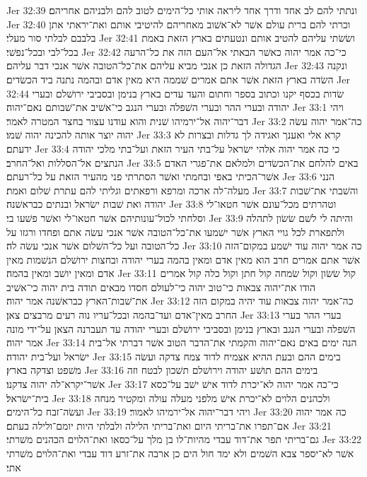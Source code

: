 Jer 32:39  ונתתי להם לב אחד ודרך אחד ליראה אותי כל־הימים לטוב להם ולבניהם אחריהם׃
Jer 32:40  וכרתי להם ברית עולם אשׁר לא־אשׁוב מאחריהם להיטיבי אותם ואת־יראתי אתן בלבבם לבלתי סור מעלי׃
Jer 32:41  ושׂשׂתי עליהם להטיב אותם ונטעתים בארץ הזאת באמת בכל־לבי ובכל־נפשׁי׃
Jer 32:42  כי־כה אמר יהוה כאשׁר הבאתי אל־העם הזה את כל־הרעה הגדולה הזאת כן אנכי מביא עליהם את־כל־הטובה אשׁר אנכי דבר עליהם׃
Jer 32:43  ונקנה השׂדה בארץ הזאת אשׁר אתם אמרים שׁממה היא מאין אדם ובהמה נתנה ביד הכשׂדים׃
Jer 32:44  שׂדות בכסף יקנו וכתוב בספר וחתום והעד עדים בארץ בנימן ובסביבי ירושׁלם ובערי יהודה ובערי ההר ובערי השׁפלה ובערי הנגב כי־אשׁיב את־שׁבותם נאם־יהוה׃
Jer 33:1  ויהי דבר־יהוה אל־ירמיהו שׁנית והוא עודנו עצור בחצר המטרה לאמר׃
Jer 33:2  כה־אמר יהוה עשׂה יהוה יוצר אותה להכינה יהוה שׁמו׃
Jer 33:3  קרא אלי ואענך ואגידה לך גדלות ובצרות לא ידעתם׃
Jer 33:4  כי כה אמר יהוה אלהי ישׂראל על־בתי העיר הזאת ועל־בתי מלכי יהודה הנתצים אל־הסללות ואל־החרב׃
Jer 33:5  באים להלחם את־הכשׂדים ולמלאם את־פגרי האדם אשׁר־הכיתי באפי ובחמתי ואשׁר הסתרתי פני מהעיר הזאת על כל־רעתם׃
Jer 33:6  הנני מעלה־לה ארכה ומרפא ורפאתים וגליתי להם עתרת שׁלום ואמת׃
Jer 33:7  והשׁבתי את־שׁבות יהודה ואת שׁבות ישׂראל ובנתים כבראשׁנה׃
Jer 33:8  וטהרתים מכל־עונם אשׁר חטאו־לי וסלחתי לכול־עונותיהם אשׁר חטאו־לי ואשׁר פשׁעו בי׃
Jer 33:9  והיתה לי לשׁם שׂשׂון לתהלה ולתפארת לכל גויי הארץ אשׁר ישׁמעו את־כל־הטובה אשׁר אנכי עשׂה אתם ופחדו ורגזו על כל־הטובה ועל כל־השׁלום אשׁר אנכי עשׂה לה׃
Jer 33:10  כה אמר יהוה עוד ישׁמע במקום־הזה אשׁר אתם אמרים חרב הוא מאין אדם ומאין בהמה בערי יהודה ובחצות ירושׁלם הנשׁמות מאין אדם ומאין יושׁב ומאין בהמה׃
Jer 33:11  קול שׂשׂון וקול שׂמחה קול חתן וקול כלה קול אמרים הודו את־יהוה צבאות כי־טוב יהוה כי־לעולם חסדו מבאים תודה בית יהוה כי־אשׁיב את־שׁבות־הארץ כבראשׁנה אמר יהוה׃
Jer 33:12  כה־אמר יהוה צבאות עוד יהיה במקום הזה החרב מאין־אדם ועד־בהמה ובכל־עריו נוה רעים מרבצים צאן׃
Jer 33:13  בערי ההר בערי השׁפלה ובערי הנגב ובארץ בנימן ובסביבי ירושׁלם ובערי יהודה עד תעברנה הצאן על־ידי מונה אמר יהוה׃
Jer 33:14  הנה ימים באים נאם־יהוה והקמתי את־הדבר הטוב אשׁר דברתי אל־בית ישׂראל ועל־בית יהודה׃
Jer 33:15  בימים ההם ובעת ההיא אצמיח לדוד צמח צדקה ועשׂה משׁפט וצדקה בארץ׃
Jer 33:16  בימים ההם תושׁע יהודה וירושׁלם תשׁכון לבטח וזה אשׁר־יקרא־לה יהוה צדקנו׃
Jer 33:17  כי־כה אמר יהוה לא־יכרת לדוד אישׁ ישׁב על־כסא בית־ישׂראל׃
Jer 33:18  ולכהנים הלוים לא־יכרת אישׁ מלפני מעלה עולה ומקטיר מנחה ועשׂה־זבח כל־הימים׃
Jer 33:19  ויהי דבר־יהוה אל־ירמיהו לאמור׃
Jer 33:20  כה אמר יהוה אם־תפרו את־בריתי היום ואת־בריתי הלילה ולבלתי היות יומם־ולילה בעתם׃
Jer 33:21  גם־בריתי תפר את־דוד עבדי מהיות־לו בן מלך על־כסאו ואת־הלוים הכהנים משׁרתי׃
Jer 33:22  אשׁר לא־יספר צבא השׁמים ולא ימד חול הים כן ארבה את־זרע דוד עבדי ואת־הלוים משׁרתי אתי׃

